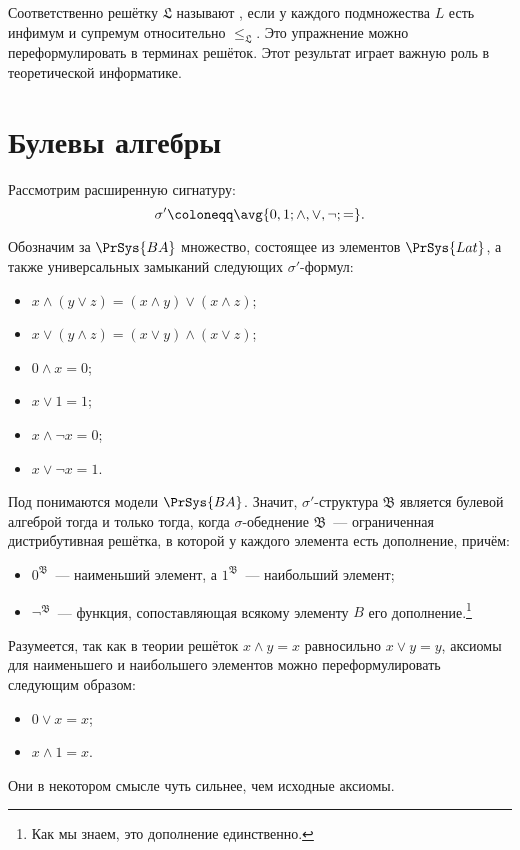 

\begin{remark*}
    Соответственно решётку $\mathfrak{L}$ называют , если у каждого подмножества $L$ есть
    инфимум и супремум относительно $\leq_{\mathfrak{L}}$. Это упражнение можно переформулировать в
    терминах решёток. Этот результат играет важную роль в теоретической информатике.
\end{remark*}


\section*{Булевы алгебры}

Рассмотрим расширенную сигнатуру:
$$
    \sigma' \coloneqq \avg{0, 1; \land, \lor, \neg; =}.
$$

Обозначим за $\PrSys{BA}$ множество, состоящее из элементов $\PrSys{Lat}$, а также универсальных
замыканий следующих $\sigma'$-формул:
\begin{itemize}
    \item $x \land (y \lor z) = (x \land y) \lor (x \land z)$;
    \item $x \lor (y \land z) = (x \lor y) \land (x \lor z)$;
    \item $0 \land x = 0$;
    \item $x \lor 1 = 1$;
    \item $x \land \neg x = 0$; \hfill {}
    \item $x \lor \neg x = 1$. \hfill \hinttext{аксиома дополнения}
\end{itemize}
Под  понимаются модели $\PrSys{BA}$. Значит, $\sigma'$-структура
$\mathfrak{B}$ является булевой алгеброй тогда и только тогда, когда $\sigma$-обеднение
$\mathfrak{B}$~--- ограниченная дистрибутивная решётка, в которой у каждого элемента есть дополнение,
причём: 
\begin{itemize}
    \item $0^{\mathfrak{B}}$~--- наименьший элемент, а $1^{\mathfrak{B}}$~--- наибольший элемент;
    \item $\neg^{\mathfrak{B}}$~--- функция, сопоставляющая всякому элементу $B$ его
        дополнение.\footnote{Как мы знаем, это дополнение единственно.}
\end{itemize}
Разумеется, так как в теории решёток $x \land y = x$ равносильно $x \lor y = y$, аксиомы для наименьшего
и наибольшего элементов можно переформулировать следующим образом:
\begin{itemize}
    \item $0 \lor x = x$;
    \item $x \land 1 = x$.
\end{itemize}
Они в некотором смысле чуть сильнее, чем исходные аксиомы.



